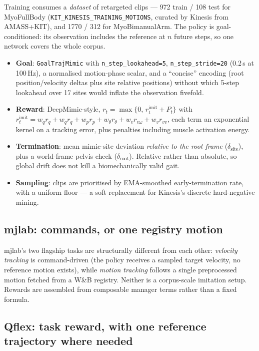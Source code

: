 \documentclass[11pt,a4paper]{article}
\begin{document}
Training consumes a \emph{dataset} of retargeted clips --- 972 train / 108 test for
MyoFullBody (\texttt{KIT\_KINESIS\_TRAINING\_MOTIONS}, curated by Kinesis from AMASS+KIT),
and 1770 / 312 for MyoBimanualArm. The policy is goal-conditioned: its observation
includes the reference at $n$ future steps, so one network covers the whole corpus.

\begin{itemize}[leftmargin=1.4em,itemsep=0.2em]
\item \textbf{Goal}: \texttt{GoalTrajMimic} with \texttt{n\_step\_lookahead=5},
\texttt{n\_step\_stride=20} (0.2\,s at 100\,Hz), a normalised motion-phase scalar, and a
``concise'' encoding (root position/velocity deltas plus site relative positions) without
which 5-step lookahead over 17 sites would inflate the observation fivefold.
\item \textbf{Reward}: DeepMimic-style, $r_t = \max\{0,\, r^{\text{imit}}_t + P_t\}$ with
$r^{\text{imit}}_t = w_q r_q + w_{\dot q} r_{\dot q} + w_p r_p + w_\theta r_\theta
+ w_v r_{v\omega} + w_v r_{vv}$, each term an exponential kernel on a tracking error,
plus penalties including muscle activation energy.
\item \textbf{Termination}: mean mimic-site deviation \emph{relative to the root frame}
($\delta_{\text{site}}$), plus a world-frame pelvis check ($\delta_{\text{root}}$).
Relative rather than absolute, so global drift does not kill a biomechanically valid gait.
\item \textbf{Sampling}: clips are prioritised by EMA-smoothed early-termination rate,
with a uniform floor --- a soft replacement for Kinesis's discrete hard-negative mining.
\end{itemize}

\subsection{mjlab: commands, or one registry motion}

mjlab's two flagship tasks are structurally different from each other:
\emph{velocity tracking} is command-driven (the policy receives a sampled target velocity,
no reference motion exists), while \emph{motion tracking} follows a single preprocessed
motion fetched from a W\&B registry. Neither is a corpus-scale imitation setup. Rewards
are assembled from composable manager terms rather than a fixed formula.

\subsection{Qflex: task reward, with one reference trajectory where needed}
\end{document}
